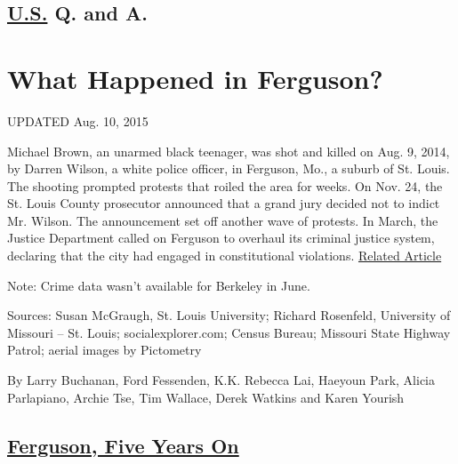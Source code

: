 \hypertarget{-us--q-and-a}{%
\subsection{\texorpdfstring{
\href{https://www.nytimes.com/section/us}{U.S.} \textbar{}Q. and
A.}{ U.S.  \textbar{}Q. and A.}}\label{-us--q-and-a}}

\hypertarget{what-happened-in-ferguson}{%
\section{What Happened in Ferguson?}\label{what-happened-in-ferguson}}

UPDATED Aug. 10, 2015

Michael Brown, an unarmed black teenager, was shot and killed on Aug. 9,
2014, by Darren Wilson, a white police officer, in Ferguson, Mo., a
suburb of St. Louis. The shooting prompted protests that roiled the area
for weeks. On Nov. 24, the St. Louis County prosecutor announced that a
grand jury decided not to indict Mr. Wilson. The announcement set off
another wave of protests. In March, the Justice Department called on
Ferguson to overhaul its criminal justice system, declaring that the
city had engaged in constitutional violations.
\href{https://www.nytimes.com/2014/11/25/us/ferguson-darren-wilson-shooting-michael-brown-grand-jury.html}{Related
Article}

Note: Crime data wasn't available for Berkeley in June.

Sources: Susan McGraugh, St. Louis University; Richard Rosenfeld,
University of Missouri -- St. Louis; socialexplorer.com; Census Bureau;
Missouri State Highway Patrol; aerial images by Pictometry

By Larry Buchanan, Ford Fessenden, K.K. Rebecca Lai, Haeyoun Park,
Alicia Parlapiano, Archie Tse, Tim Wallace, Derek Watkins and Karen
Yourish

\hypertarget{ferguson-five-years-on}{%
\subsection{\texorpdfstring{\href{https://www.nytimes.com/news-event/ferguson-michael-brown}{Ferguson,
Five Years On}}{Ferguson, Five Years On}}\label{ferguson-five-years-on}}

